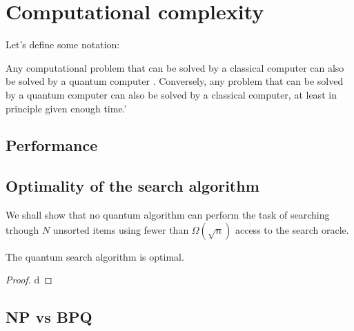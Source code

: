 \section{Computational complexity}
Let's define some notation:

Any computational problem that can be solved by a classical computer can also be solved by a quantum computer \cite[29]{NielsenChuang}. Conversely, any problem that can be solved by a quantum computer can also be solved by a classical computer, at least in principle given enough time.'
\subsection{Performance}\label{sec:performance}
\subsection{Optimality of the search algorithm}
We shall show that no quantum algorithm can perform the task of searching trhough $N$ unsorted items using fewer than $\Omega(\sqrt{n})$ access to the search oracle.
\begin{theorem}
The quantum search algorithm is optimal. 
\end{theorem}
\begin{proof}
d
\end{proof}
\subsection{NP vs BPQ}
